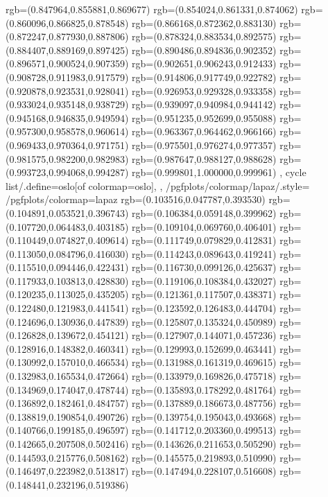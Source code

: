 {{{			rgb=(0.847964,0.855881,0.869677)
			rgb=(0.854024,0.861331,0.874062)
			rgb=(0.860096,0.866825,0.878548)
			rgb=(0.866168,0.872362,0.883130)
			rgb=(0.872247,0.877930,0.887806)
			rgb=(0.878324,0.883534,0.892575)
			rgb=(0.884407,0.889169,0.897425)
			rgb=(0.890486,0.894836,0.902352)
			rgb=(0.896571,0.900524,0.907359)
			rgb=(0.902651,0.906243,0.912433)
			rgb=(0.908728,0.911983,0.917579)
			rgb=(0.914806,0.917749,0.922782)
			rgb=(0.920878,0.923531,0.928041)
			rgb=(0.926953,0.929328,0.933358)
			rgb=(0.933024,0.935148,0.938729)
			rgb=(0.939097,0.940984,0.944142)
			rgb=(0.945168,0.946835,0.949594)
			rgb=(0.951235,0.952699,0.955088)
			rgb=(0.957300,0.958578,0.960614)
			rgb=(0.963367,0.964462,0.966166)
			rgb=(0.969433,0.970364,0.971751)
			rgb=(0.975501,0.976274,0.977357)
			rgb=(0.981575,0.982200,0.982983)
			rgb=(0.987647,0.988127,0.988628)
			rgb=(0.993723,0.994068,0.994287)
			rgb=(0.999801,1.000000,0.999961)
		},
	cycle list/.define={oslo}{[of colormap=oslo]},
	},
	/pgfplots/colormap/lapaz/.style={
		/pgfplots/colormap={lapaz}{%
			rgb=(0.103516,0.047787,0.393530)
			rgb=(0.104891,0.053521,0.396743)
			rgb=(0.106384,0.059148,0.399962)
			rgb=(0.107720,0.064483,0.403185)
			rgb=(0.109104,0.069760,0.406401)
			rgb=(0.110449,0.074827,0.409614)
			rgb=(0.111749,0.079829,0.412831)
			rgb=(0.113050,0.084796,0.416030)
			rgb=(0.114243,0.089643,0.419241)
			rgb=(0.115510,0.094446,0.422431)
			rgb=(0.116730,0.099126,0.425637)
			rgb=(0.117933,0.103813,0.428830)
			rgb=(0.119106,0.108384,0.432027)
			rgb=(0.120235,0.113025,0.435205)
			rgb=(0.121361,0.117507,0.438371)
			rgb=(0.122480,0.121983,0.441541)
			rgb=(0.123592,0.126483,0.444704)
			rgb=(0.124696,0.130936,0.447839)
			rgb=(0.125807,0.135324,0.450989)
			rgb=(0.126828,0.139672,0.454121)
			rgb=(0.127907,0.144071,0.457236)
			rgb=(0.128916,0.148382,0.460341)
			rgb=(0.129993,0.152699,0.463441)
			rgb=(0.130992,0.157010,0.466534)
			rgb=(0.131988,0.161319,0.469615)
			rgb=(0.132983,0.165534,0.472664)
			rgb=(0.133979,0.169826,0.475718)
			rgb=(0.134969,0.174047,0.478744)
			rgb=(0.135893,0.178292,0.481764)
			rgb=(0.136892,0.182461,0.484757)
			rgb=(0.137889,0.186673,0.487756)
			rgb=(0.138819,0.190854,0.490726)
			rgb=(0.139754,0.195043,0.493668)
			rgb=(0.140766,0.199185,0.496597)
			rgb=(0.141712,0.203360,0.499513)
			rgb=(0.142665,0.207508,0.502416)
			rgb=(0.143626,0.211653,0.505290)
			rgb=(0.144593,0.215776,0.508162)
			rgb=(0.145575,0.219893,0.510990)
			rgb=(0.146497,0.223982,0.513817)
			rgb=(0.147494,0.228107,0.516608)
			rgb=(0.148441,0.232196,0.519386)
}}}
